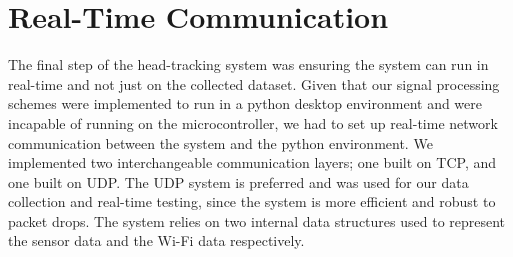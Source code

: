 \section{Real-Time Communication}
The final step of the head-tracking system was ensuring the system can run in real-time and not just on the collected dataset. Given that our signal processing schemes were implemented to run in a python desktop environment and were incapable of running on the microcontroller, we had to set up real-time network communication between the system and the python environment. We implemented two interchangeable communication layers; one built on TCP, and one built on UDP. The UDP system is preferred and was used for our data collection and real-time testing, since the system is more efficient and robust to packet drops. The system relies on two internal data structures used to represent the sensor data and the Wi-Fi data respectively.
\par

 \noindent\small
\begin{table}[h!]
\centering
{}
\caption{Structure of \texttt{DataEntry} (Size: 128 bytes).}
\label{tab:dataentry}
\end{table}

